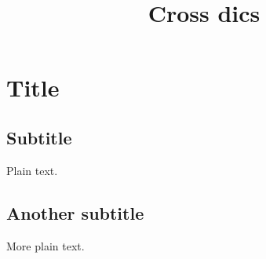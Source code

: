 \documentclass{article}
\title{Cross dics}
\begin{document}
\maketitle

\section{Title}

\subsection{Subtitle}

Plain text.

\subsection{Another subtitle}

More plain text.
\end{document}
